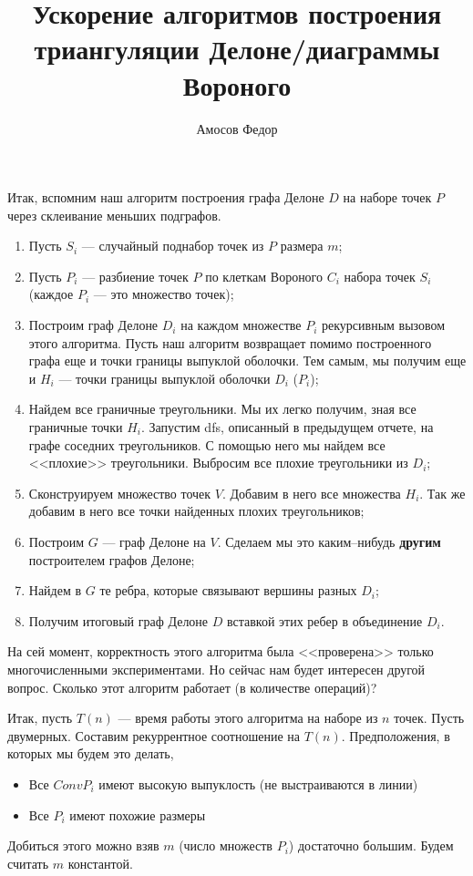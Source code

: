 \documentclass{article}
\title{\bf Ускорение алгоритмов построения триангуляции Делоне/диаграммы Вороного}
\author{Амосов Федор}
\begin{document}
	\maketitle
	
	Итак, вспомним наш алгоритм построения графа Делоне $D$ на наборе точек $P$ через склеивание меньших подграфов.
    \begin{enumerate}
        \item Пусть $S_i$ --- случайный поднабор точек из $P$ размера $m$;
        \item Пусть $P_i$ --- разбиение точек $P$ по клеткам Вороного $C_i$ набора точек $S_i$ (каждое $P_i$ --- это множество точек);
        \item Построим граф Делоне $D_i$ на каждом множестве $P_i$ рекурсивным вызовом этого алгоритма. Пусть наш алгоритм возвращает помимо построенного графа еще и точки границы выпуклой оболочки. Тем самым, мы получим еще и $H_i$ --- точки границы выпуклой оболочки $D_i$ ($P_i$);
        \item Найдем все граничные треугольники. Мы их легко получим, зная все граничные точки $H_i$. Запустим dfs, описанный в предыдущем отчете, на графе соседних треугольников. С помощью него мы найдем все <<плохие>> треугольники. Выбросим все плохие треугольники из $D_i$;
        \item Сконструируем множество точек $V$. Добавим в него все множества $H_i$. Так же добавим в него все точки найденных плохих треугольников;
        \item Построим $G$ --- граф Делоне на $V$. Сделаем мы это каким--нибудь {\bf другим} построителем графов Делоне;
        \item Найдем в $G$ те ребра, которые связывают вершины разных $D_i$;
        \item Получим итоговый граф Делоне $D$ вставкой этих ребер в объединение $D_i$.
    \end{enumerate}    
    
    На сей момент, корректность этого алгоритма была <<проверена>> только многочисленными экспериментами. Но сейчас нам будет интересен другой вопрос. Сколько этот алгоритм работает (в количестве операций)?
    
    Итак, пусть $T(n)$ --- время работы этого алгоритма на наборе из $n$ точек. Пусть двумерных. Составим рекуррентное соотношение на $T(n)$. Предположения, в которых мы будем это делать,
    \begin{itemize}
        \item Все $Conv P_i$ имеют высокую выпуклость (не выстраиваются в линии)
        \item Все $P_i$ имеют похожие размеры
    \end{itemize}    	
    Добиться этого можно взяв $m$ (число множеств $P_i$) достаточно большим. Будем считать $m$ константой.
    
\end{document}

